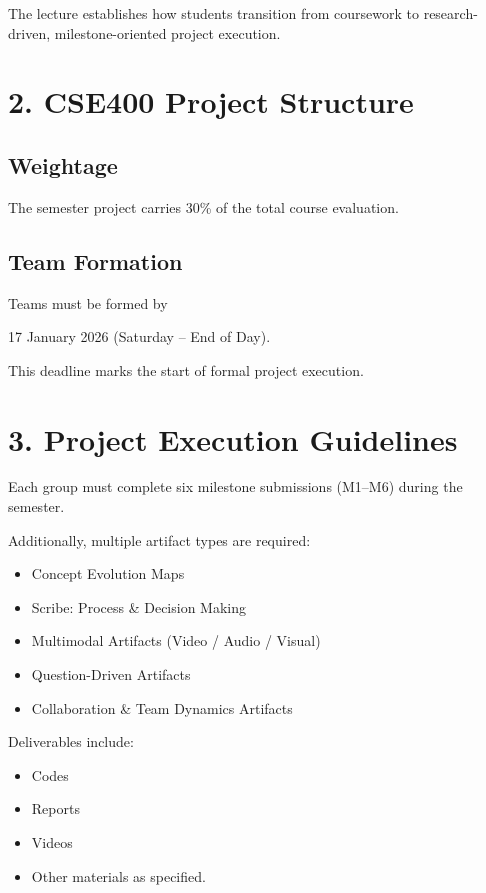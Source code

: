 \documentclass[11pt]{article}
\begin{document}
The lecture establishes how students transition from coursework to research-driven, milestone-oriented project execution.

\section*{2. CSE400 Project Structure}

\subsection*{Weightage}

The semester project carries 30\% of the total course evaluation.

\subsection*{Team Formation}

Teams must be formed by

17 January 2026 (Saturday – End of Day).

This deadline marks the start of formal project execution.

\section*{3. Project Execution Guidelines}

Each group must complete six milestone submissions (M1–M6) during the semester.

Additionally, multiple artifact types are required:

\begin{itemize}
\item Concept Evolution Maps
\item Scribe: Process \& Decision Making
\item Multimodal Artifacts (Video / Audio / Visual)
\item Question-Driven Artifacts
\item Collaboration \& Team Dynamics Artifacts
\end{itemize}

Deliverables include:

\begin{itemize}
\item Codes
\item Reports
\item Videos
\item Other materials as specified.
\end{itemize}
\end{document}
